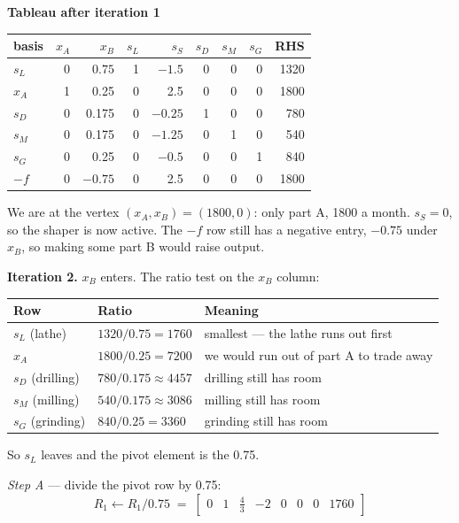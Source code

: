 \documentclass[11pt,a4paper]{article}
\newcommand{\rowv}[1]{\left[\begin{array}{VVVVVVV|V}#1\end{array}\right]}
\newcommand{\piv}[1]{\colorbox{pivot}{$#1$}}   %
\newenvironment{tableau}[1]
  {\begin{center}\begin{minipage}{\linewidth}\centering\small
   \textbf{#1}\\[0.4em]}
  {\end{minipage}\end{center}}
\begin{document}
\begin{tableau}{Tableau after iteration 1}
\begin{tabular}{l|rrrrrrr|r}
basis & $x_A$ & $x_B$ & $s_L$ & $s_S$ & $s_D$ & $s_M$ & $s_G$ & RHS \\
\hline
$s_L$ & 0 & \piv{0.75} & 1 & $-1.5$  & 0 & 0 & 0 & 1320 \\
$x_A$ & 1 & 0.25  & 0 & 2.5     & 0 & 0 & 0 & 1800 \\
$s_D$ & 0 & 0.175 & 0 & $-0.25$ & 1 & 0 & 0 & 780 \\
$s_M$ & 0 & 0.175 & 0 & $-1.25$ & 0 & 1 & 0 & 540 \\
$s_G$ & 0 & 0.25  & 0 & $-0.5$  & 0 & 0 & 1 & 840 \\
\hline
$-f$  & 0 & $-0.75$ & 0 & 2.5 & 0 & 0 & 0 & 1800 \\
\end{tabular}
\end{tableau}

We are at the vertex $(x_A, x_B) = (1800, 0)$: only part A, 1800 a month.
$s_S = 0$, so the shaper is now active. The $-f$ row still has a negative entry,
$-0.75$ under $x_B$, so making some part B would raise output.

\textbf{Iteration 2.} $x_B$ enters. The ratio test on the $x_B$ column:

\begin{center}
\begin{tabular}{lll}
\toprule
Row & Ratio & Meaning \\
\midrule
$s_L$ (lathe)    & $1320/0.75 = 1760$       & smallest --- the lathe runs out first \\
$x_A$            & $1800/0.25 = 7200$       & we would run out of part A to trade away \\
$s_D$ (drilling) & $780/0.175 \approx 4457$ & drilling still has room \\
$s_M$ (milling)  & $540/0.175 \approx 3086$ & milling still has room \\
$s_G$ (grinding) & $840/0.25 = 3360$        & grinding still has room \\
\bottomrule
\end{tabular}
\end{center}

So $s_L$ leaves and the pivot element is the 0.75.

\emph{Step A} --- divide the pivot row by 0.75:
\[
  R_1 \leftarrow R_1/0.75 \;=\; \rowv{0 & 1 & \tfrac{4}{3} & -2 & 0 & 0 & 0 & 1760}
\]
\end{document}
